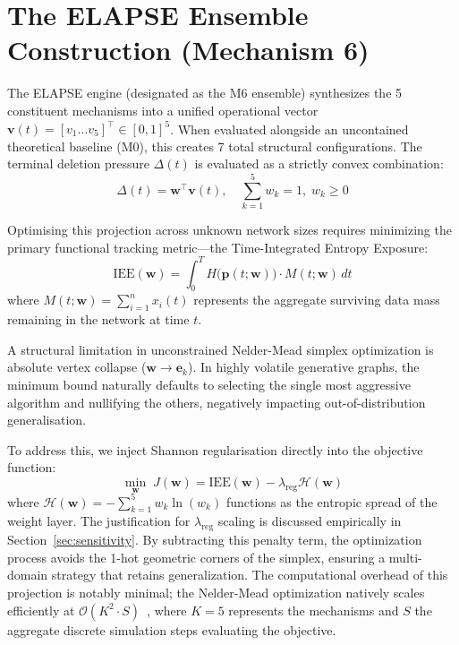 \documentclass[conference]{IEEEtran}
\begin{document}
\section{The ELAPSE Ensemble Construction (Mechanism 6)}
\label{sec:ensemble}

The ELAPSE engine (designated as the M6 ensemble) synthesizes the 5 constituent
mechanisms into a unified operational vector
$\mathbf{v}(t) = [v_1 \ldots v_5]^\top \in [0,1]^5$. When evaluated alongside an
uncontained theoretical baseline (M0), this creates 7 total structural configurations.
The terminal deletion pressure $\Delta(t)$ is evaluated as a strictly convex
combination:
\begin{equation}
  \Delta(t) = \mathbf{w}^\top \mathbf{v}(t), \quad
  \sum_{k=1}^{5} w_k = 1,\; w_k \geq 0
  \label{eq:ensemble}
\end{equation}

Optimising this projection across unknown network sizes requires minimizing the primary
functional tracking metric---the Time-Integrated Entropy Exposure:
\begin{equation}
  \mathrm{IEE}(\mathbf{w}) = \int_0^T H\!\bigl(\mathbf{p}(t;\mathbf{w})\bigr)
                              \cdot M(t;\mathbf{w})\, dt
  \label{eq:iee}
\end{equation}
where $M(t;\mathbf{w}) = \sum_{i=1}^n x_i(t)$ represents the aggregate surviving data
mass remaining in the network at time $t$.

A structural limitation in unconstrained Nelder-Mead simplex optimization is absolute
vertex collapse ($\mathbf{w} \to \mathbf{e}_k$). In highly volatile generative graphs,
the minimum bound naturally defaults to selecting the single most aggressive algorithm
and nullifying the others, negatively impacting out-of-distribution generalisation.

To address this, we inject Shannon regularisation directly into the objective function:
\begin{equation}
  \min_{\mathbf{w}}\; J(\mathbf{w}) = \mathrm{IEE}(\mathbf{w}) - \lambda_{\mathrm{reg}}\mathcal{H}(\mathbf{w})
  \label{eq:objective}
\end{equation}
where $\mathcal{H}(\mathbf{w}) = -\sum_{k=1}^{5} w_k \ln(w_k)$ functions as the
entropic spread of the weight layer. The justification for $\lambda_{\mathrm{reg}}$
scaling is discussed empirically in Section~\ref{sec:sensitivity}. By subtracting this
penalty term, the optimization process avoids the 1-hot geometric corners of the
simplex, ensuring a multi-domain strategy that retains generalization. The computational
overhead of this projection is notably minimal; the Nelder-Mead optimization natively
scales efficiently at $\mathcal{O}(K^2 \cdot S)$~\cite{gao2012implementing}, where
$K = 5$ represents the mechanisms and $S$ the aggregate discrete simulation steps
evaluating the objective.
\end{document}

